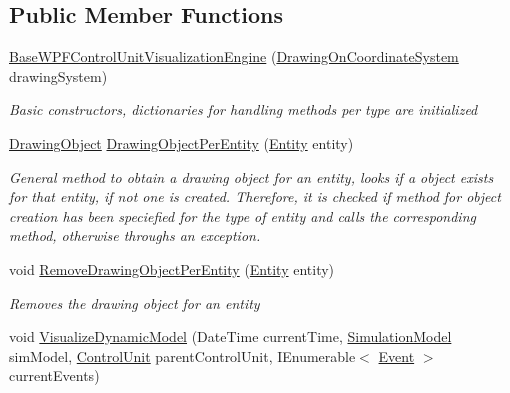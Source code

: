 \subsection*{Public Member Functions}
\begin{DoxyCompactItemize}
\item 
\hyperlink{class_simulation_w_p_f_visualization_tools_1_1_base_w_p_f_control_unit_visualization_engine_a586a9ede8f029cb48683a8d0ec3d6d07}{Base\+W\+P\+F\+Control\+Unit\+Visualization\+Engine} (\hyperlink{class_w_p_f_visualization_base_1_1_drawing_on_coordinate_system}{Drawing\+On\+Coordinate\+System} drawing\+System)
\begin{DoxyCompactList}\small\item\em Basic constructors, dictionaries for handling methods per type are initialized \end{DoxyCompactList}\item 
\hyperlink{class_w_p_f_visualization_base_1_1_drawing_object}{Drawing\+Object} \hyperlink{class_simulation_w_p_f_visualization_tools_1_1_base_w_p_f_control_unit_visualization_engine_a8c2b0f33c8b17c55f7d3c73098e72eaf}{Drawing\+Object\+Per\+Entity} (\hyperlink{class_simulation_core_1_1_h_c_c_m_elements_1_1_entity}{Entity} entity)
\begin{DoxyCompactList}\small\item\em General method to obtain a drawing object for an entity, looks if a object exists for that entity, if not one is created. Therefore, it is checked if method for object creation has been speciefied for the type of entity and calls the corresponding method, otherwise throughs an exception. \end{DoxyCompactList}\item 
void \hyperlink{class_simulation_w_p_f_visualization_tools_1_1_base_w_p_f_control_unit_visualization_engine_a8653a9f0a54f94bebf06282ae02fcbd0}{Remove\+Drawing\+Object\+Per\+Entity} (\hyperlink{class_simulation_core_1_1_h_c_c_m_elements_1_1_entity}{Entity} entity)
\begin{DoxyCompactList}\small\item\em Removes the drawing object for an entity \end{DoxyCompactList}\item 
void \hyperlink{class_simulation_w_p_f_visualization_tools_1_1_base_w_p_f_control_unit_visualization_engine_a3a323863bcbda3f91e0e29f38ddf85ed}{Visualize\+Dynamic\+Model} (Date\+Time current\+Time, \hyperlink{class_simulation_core_1_1_simulation_classes_1_1_simulation_model}{Simulation\+Model} sim\+Model, \hyperlink{class_simulation_core_1_1_h_c_c_m_elements_1_1_control_unit}{Control\+Unit} parent\+Control\+Unit, I\+Enumerable$<$ \hyperlink{class_simulation_core_1_1_h_c_c_m_elements_1_1_event}{Event} $>$ current\+Events)

\end{DoxyCompactItemize}
